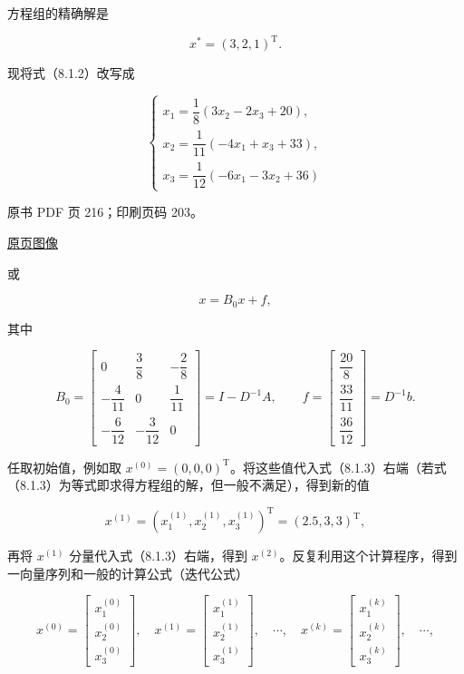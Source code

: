 方程组的精确解是

\[
x^*=(3,2,1)^{\mathrm T}.
\]

现将式（8.1.2）改写成

\[
\begin{cases}
x_1=\dfrac18(3x_2-2x_3+20),\\[4pt]
x_2=\dfrac1{11}(-4x_1+x_3+33),\\[4pt]
x_3=\dfrac1{12}(-6x_1-3x_2+36)
\end{cases}
\tag{8.1.3}
\]

\clearpage

原书 PDF 页 216；印刷页码 203。

\href{source-images/pdf-216.jpeg}{原页图像}

或

\[
x=B_0x+f,
\]

其中

\[
B_0=\begin{bmatrix}
0&\dfrac38&-\dfrac28\\[4pt]
-\dfrac4{11}&0&\dfrac1{11}\\[4pt]
-\dfrac6{12}&-\dfrac3{12}&0
\end{bmatrix}=I-D^{-1}A,\qquad
f=\begin{bmatrix}\dfrac{20}8\\[4pt]\dfrac{33}{11}\\[4pt]\dfrac{36}{12}\end{bmatrix}=D^{-1}b.
\]

任取初始值，例如取 \(x^{(0)}=(0,0,0)^{\mathrm T}\)。将这些值代入式（8.1.3）右端（若式（8.1.3）为等式即求得方程组的解，但一般不满足），得到新的值

\[
x^{(1)}=(x_1^{(1)},x_2^{(1)},x_3^{(1)})^{\mathrm T}=(2.5,3,3)^{\mathrm T},
\]

再将 \(x^{(1)}\) 分量代入式（8.1.3）右端，得到 \(x^{(2)}\)。反复利用这个计算程序，得到一向量序列和一般的计算公式（迭代公式）

\[
x^{(0)}=\begin{bmatrix}x_1^{(0)}\\x_2^{(0)}\\x_3^{(0)}\end{bmatrix},\quad
x^{(1)}=\begin{bmatrix}x_1^{(1)}\\x_2^{(1)}\\x_3^{(1)}\end{bmatrix},\quad\cdots,\quad
x^{(k)}=\begin{bmatrix}x_1^{(k)}\\x_2^{(k)}\\x_3^{(k)}\end{bmatrix},\quad\cdots,
\]


